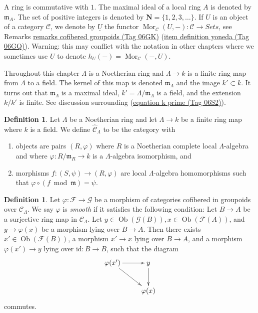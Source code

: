 \documentclass{amsart}
\theoremstyle{plain}
\theoremstyle{definition}
\newtheorem{definition}[subsection]{Definition}
\theoremstyle{remark}
\numberwithin{equation}{subsection}
\def\Mor{\mathop{\mathrm{Mor}}\nolimits}
\def\Ob{\mathop{\mathrm{Ob}}\nolimits}
\begin{document}
\noindent
A ring is commutative with $1$. The  maximal ideal of a local ring $A$
is denoted by $\mathfrak{m}_A$. The set of positive integers is denoted
by $\mathbf{N} = \{1, 2, 3, \ldots\}$. If $U$ is an object of a
category $\mathcal{C}$, we denote by $\underline{U}$
the functor
$\Mor_\mathcal{C}(U, -): \mathcal{C} \to \textit{Sets}$, see
Remarks \href{https://stacks.math.columbia.edu/tag/06GK}{remarks cofibered groupoids (Tag 06GK)} (\href{https://stacks.math.columbia.edu/tag/06GQ}{item definition yoneda (Tag 06GQ)}).
Warning: this may conflict with the notation in other chapters where we
sometimes use $\underline{U}$ to denote $h_U(-) = \Mor_\mathcal{C}(-, U)$.

\medskip\noindent
Throughout this chapter $\Lambda$ is a Noetherian ring and
$\Lambda \to k$ is a finite ring map from $\Lambda$ to a field.
The kernel of this map is denoted $\mathfrak m_\Lambda$ and the
image $k' \subset k$. It turns out that $\mathfrak m_\Lambda$ is
a maximal ideal, $k' = \Lambda/\mathfrak m_\Lambda$ is a field, and
the extension $k/k'$ is finite. See discussion surrounding
(\href{https://stacks.math.columbia.edu/tag/06S2}{equation k prime (Tag 06S2)}).




\begin{definition}
\label{definition-completion-CLambda}
Let $\Lambda$ be a Noetherian ring and let $\Lambda \to k$ be a finite
ring map where $k$ is a field. We define {\it $\widehat{\mathcal{C}}_\Lambda$}
to be the category with
\begin{enumerate}
\item objects are pairs $(R, \varphi)$ where $R$ is a Noetherian complete
local $\Lambda$-algebra and where $\varphi : R/\mathfrak m_R \to k$ is a
$\Lambda$-algebra isomorphism, and
\item morphisms $f : (S, \psi) \to (R, \varphi)$ are local $\Lambda$-algebra
homomorphisms such that $\varphi \circ (f \bmod \mathfrak m) = \psi$.
\end{enumerate}
\end{definition}

\begin{definition}
\label{definition-smooth-morphism}
Let $\varphi : \mathcal{F} \to \mathcal{G}$ be a morphism of categories
cofibered in groupoids over $\mathcal{C}_\Lambda$.  We say  $\varphi$ is
{\it smooth} if it satisfies the following condition: Let $B \to A$ be
a surjective ring map in $\mathcal{C}_\Lambda$.  Let $y \in
\Ob(\mathcal{G}(B)), x \in \Ob(\mathcal{F}(A))$, and $y
\to \varphi(x)$ be a morphism lying over $B \to A$.  Then there
exists $x' \in \Ob(\mathcal{F}(B))$, a morphism $x' \to x$
lying over $B \to A$, and a morphism $\varphi(x') \to y$ lying
over $\text{id}: B \to B$, such that the diagram
$$
\xymatrix{
\varphi(x') \ar[r] \ar[dr] & y \ar[d] \\
& \varphi(x)
}
$$
commutes.
\end{definition}
\end{document}
